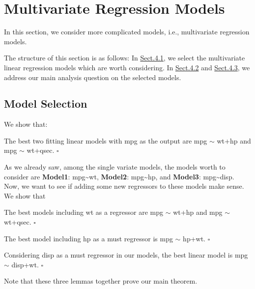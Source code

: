 \documentclass[]{article}
\begin{document}
\hypertarget{sec-mult}{\section{Multivariate Regression
Models}\label{sec-mult}}

In this section, we consider more complicated models, i.e., multivariate
regression models.

The structure of this section is as follows: In
\protect\hyperlink{sec-mult-select}{Sect.4.1}, we select the
multivariate linear regression models which are worth considering. In
\protect\hyperlink{sec-fit-wthp}{Sect.4.2} and
\protect\hyperlink{sec-fit-wtqsec}{Sect.4.3}, we address our main
analysis question on the selected models.

\hypertarget{sec-mult-select}{\subsection{Model
Selection}\label{sec-mult-select}}

We show that:

\begin{theorem}
The best two fitting linear models with mpg as the output are mpg $\sim$ wt+hp and mpg $\sim$ wt+qsec. $\square$
\end{theorem}

As we already saw, among the single variate models, the models worth to
consider are \textbf{Model1}: mpg\textasciitilde{}wt, \textbf{Model2}:
mpg\textasciitilde{}hp, and \textbf{Model3}: mpg\textasciitilde{}disp.
Now, we want to see if adding some new regressors to these models make
sense. We show that

\begin{lemma}\label{lem:lem1}
The best models including wt as a regressor are mpg $\sim$ wt+hp and mpg $\sim$ wt+qsec. $\square$ 
\end{lemma}

\begin{lemma}\label{lem:lem2}
The best model including hp as a must regressor is mpg $\sim$ hp+wt.  $\square$
\end{lemma}

\begin{lemma}\label{lem:lem3}
Considering disp as a must regressor in our models, the best linear model is mpg $\sim$ disp+wt. $\square$ 
\end{lemma}

Note that these three lemmas together prove our main theorem.
\end{document}
